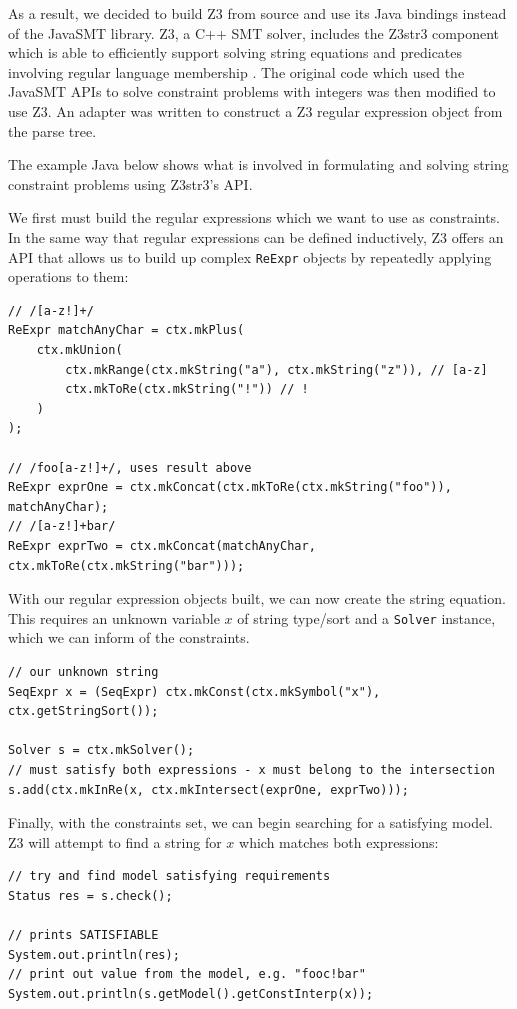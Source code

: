 \documentclass[a4paper]{article}
\begin{document}
As a result, we decided to build Z3 from source and use its Java bindings instead of the JavaSMT library. Z3, a C++ SMT solver, includes the Z3str3 component which is able to efficiently support solving string equations and predicates involving regular language membership \citep{berzish2017z3str3}. The original code which used the JavaSMT APIs to solve constraint problems with integers was then modified to use Z3. An adapter was written to construct a Z3 regular expression object from the parse tree.

The example Java below shows what is involved in formulating and solving string constraint problems using Z3str3's API.

We first must build the regular expressions which we want to use as constraints. In the same way that regular expressions can be defined inductively, Z3 offers an API that allows us to build up complex \texttt{ReExpr} objects by repeatedly applying operations to them:

\begin{verbatim}
// /[a-z!]+/
ReExpr matchAnyChar = ctx.mkPlus(
    ctx.mkUnion(
        ctx.mkRange(ctx.mkString("a"), ctx.mkString("z")), // [a-z]
        ctx.mkToRe(ctx.mkString("!")) // !
    )
);

// /foo[a-z!]+/, uses result above
ReExpr exprOne = ctx.mkConcat(ctx.mkToRe(ctx.mkString("foo")), matchAnyChar);
// /[a-z!]+bar/
ReExpr exprTwo = ctx.mkConcat(matchAnyChar, ctx.mkToRe(ctx.mkString("bar")));
\end{verbatim}

With our regular expression objects built, we can now create the string equation. This requires an unknown variable $x$ of string type/sort and a \texttt{Solver} instance, which we can inform of the constraints.

\begin{verbatim}
// our unknown string
SeqExpr x = (SeqExpr) ctx.mkConst(ctx.mkSymbol("x"), ctx.getStringSort());

Solver s = ctx.mkSolver();
// must satisfy both expressions - x must belong to the intersection
s.add(ctx.mkInRe(x, ctx.mkIntersect(exprOne, exprTwo)));
\end{verbatim}
Finally, with the constraints set, we can begin searching for a satisfying model. Z3 will attempt to find a string for $x$ which matches both expressions:

\begin{verbatim}
// try and find model satisfying requirements
Status res = s.check();

// prints SATISFIABLE
System.out.println(res);
// print out value from the model, e.g. "fooc!bar"
System.out.println(s.getModel().getConstInterp(x));
\end{verbatim}
\end{document}
